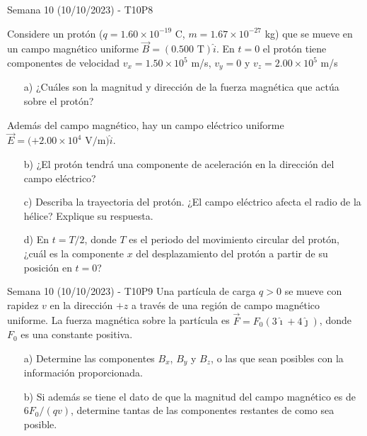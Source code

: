 \begin{frame}{Semana 10 (10/10/2023) - T10P8}
    
     Considere un protón ($q=1.60\times10^{-19}$ C, $m= 1.67\times 10^{-27}$ kg) que se mueve en un campo magnético uniforme $\vec{B}=(0.500\text{ T})\hat{i}$. En $t=0$ el protón tiene componentes de velocidad $v_x=1.50\times10^5$ m/s, $v_y=0$ y $v_z=2.00\times10^5$ m/s

\begin{itemize}
    \item[a)] ¿Cuáles son la magnitud y dirección de la fuerza magnética que actúa sobre el protón? 
    
    \end{itemize}
    
    Además del campo magnético, hay un campo eléctrico uniforme $\vec{E}=(+2.00\times 10^4\text{ V/m)}\hat{i}$.
    
    \begin{itemize}
    \item[b)] ¿El protón tendrá una componente de aceleración en la dirección del campo el\'ectrico?
    \item[c)] Describa la trayectoria del prot\'on. ¿El campo el\'ectrico afecta el radio de la hélice? Explique su respuesta.
    
    \item[d)] En $t=T/2$, donde $T$ es el periodo del movimiento circular del protón, ¿cuál es la componente $x$ del desplazamiento del protón a partir de su posición en $t=0$?

\end{itemize}

    
\end{frame}

\begin{frame}{Semana 10 (10/10/2023) - T10P9}
    Una partícula de carga $q>0$ se mueve con rapidez $v$ en la
dirección $+z$ a través de una región de campo magnético uniforme.
La fuerza magnética sobre la partícula es $\vec{F}=F_0(3\hat{\imath}+4\hat{\jmath})$, donde $F_0$
es una constante positiva.
\begin{itemize}
    \item[a)] Determine las componentes $B_x$, $B_y$ y $B_z$,
o las que sean posibles con la información proporcionada.
    \item[b)] Si además se tiene el dato de que la magnitud del campo magnético es de
$6F_0/(qv)$, determine tantas de las componentes restantes de como sea
posible.
\end{itemize}
\end{frame}

